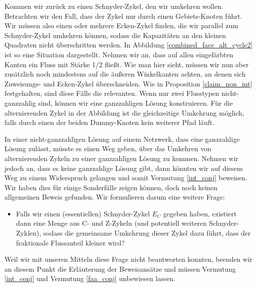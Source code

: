 \begin{example}
Kommen wir zurück zu einen Schnyder-Zykel, den wir umkehren wollen. Betrachten wir den Fall, dass der Zykel nur durch einen Gebiets-Knoten führt. Wir müssen also einen oder mehrere Ecken-Zykel finden, die wir parallel zum Schnyder-Zykel umkehren können, sodass die Kapazitäten an den kleinen Quadraten nicht überschritten werden. In Abbildung \ref{combined_face_alt_cycle2} ist so eine Situation dargestellt. Nehmen wir an, dass auf allen eingefärbten Kanten ein Fluss mit Stärke 1/2 fließt. Wie man hier sieht, müssen wir nun aber zusätzlich noch mindestens auf die äußeren Winkelkanten achten, an denen sich Zuweisungs- und Ecken-Zykel überschneiden. Wie in Proposition \ref{claim_non_int} festgehalten, sind diese Fälle die relevanten. Wenn nur zwei Flusstypen nicht-ganzzahlig sind, können wir eine ganzzahligen Lösung konstruieren. Für die alternierenden Zykel in der Abbildung ist die gleichzeitige Umkehrung möglich, falls durch einen der beiden Dummy-Knoten kein weiterer Pfad läuft.
\end{example}

In einer nicht-ganzzahligen Lösung auf einem Netzwerk, dass eine ganzzahlige Lösung zulässt, müsste es einen Weg geben, über das Umkehren von alternierenden Zykeln zu einer ganzzahligen Lösung zu kommen. Nehmen wir jedoch an, dass es keine ganzzahlige Lösung gibt, dann könnten wir auf diesem Weg zu einem Widerspruch gelangen und somit Vermutung \ref{int_conj} beweisen. Wir haben dies für einige Sonderfälle zeigen können, doch noch keinen allgemeinen Beweis gefunden. Wir formulieren darum eine weitere Frage:
\begin{itemize}
\item Falls wir einen (essentiellen) Schnyder-Zykel $E_C$ gegeben haben, existiert dann eine Menge aus C- und Z-Zykeln (und potentiell weiteren Schnyder-Zyklen), sodass die gemeinsame Umkehrung dieser Zykel dazu führt, dass der fraktionale Flussanteil kleiner wird?
\end{itemize}
Weil wir mit unseren Mitteln diese Frage nicht beantworten konnten, beenden wir an diesem Punkt die Erläuterung der Beweisansätze und müssen Vermutung \ref{int_conj} und Vermutung \ref{faa_conj} unbewiesen lassen.
